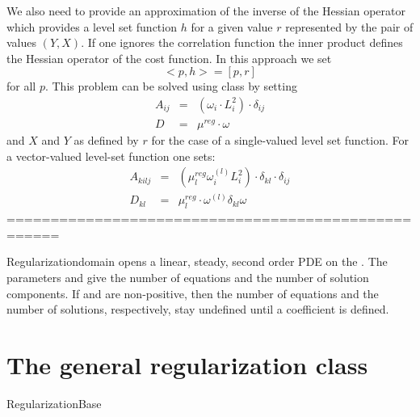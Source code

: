 We also need to provide an approximation of the inverse of the Hessian operator which provides a 
level set function $h$ for a given value $r$ represented by the pair of values $(Y,X)$. If one ignores the correlation function
the inner product defines the Hessian operator of the cost function. In this approach we set 
\begin{equation}\label{EQU:REG:8}
 < p,   h > = [p, r]
\end{equation} 
for all $p$. This problem can be solved using \escript {} class by setting
\begin{equation}\label{EQU:REG:8b}
\begin{array}{rcl}
 A_{ij} & =&  (\omega_i \cdot L_i^2) \cdot \delta_{ij}  \\
D & = & \mu^{reg} \cdot \omega
\end{array}
\end{equation} 
and $X$ and $Y$ as defined by $r$ for the case of a single-valued level set function.
For a vector-valued level-set function one sets:
\begin{equation}\label{EQU:REG:8c}
\begin{array}{rcl}
 A_{kilj} & = & (\mu^{reg}_l \omega^{(l)}_i L_i^2) \cdot  \delta_{kl} \cdot  \delta_{ij}  \\
D_{kl} & =  & \mu^{reg}_l  \cdot \omega^{(l)} \delta_{kl}  \omega
\end{array}
\end{equation} 
====================================================
\begin{classdesc}{Regularization}{domain
        }
opens a linear, steady, second order PDE on the .
The parameters  and  give the number
of equations and the number of solution components.
If  and  are non-positive, then the
number of equations and the number of solutions, respectively, stay undefined
until a coefficient is defined.
\end{classdesc}
 


\section{The general regularization class}
\begin{classdesc}{RegularizationBase}{}

\end{classdesc}
